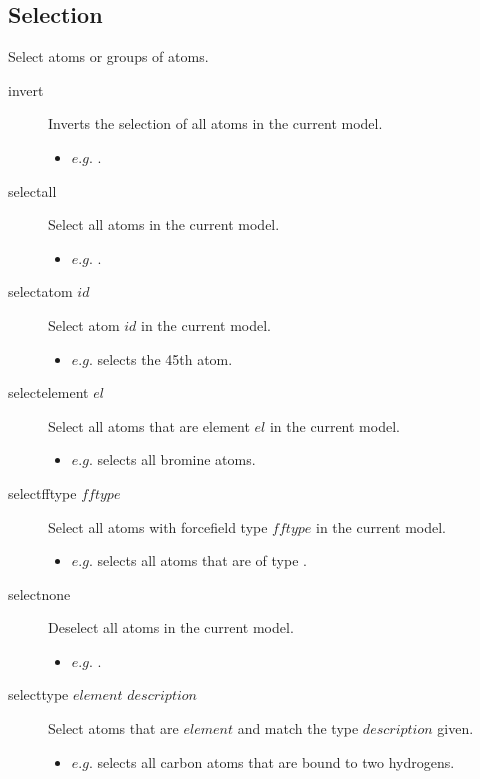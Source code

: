\subsection{Selection}
Select atoms or groups of atoms.\\
\begin{description}

	\item[invert\its] Inverts the selection of all atoms in the current model.
	\begin{itemize}
		\item $e.g.$ .
	\end{itemize}

	\item[selectall\its] Select all atoms in the current model.
	\begin{itemize}
		\item $e.g.$ .
	\end{itemize}

	\item[selectatom $id$\its] Select atom $id$ in the current model.
	\begin{itemize}
		\item $e.g.$  selects the 45th atom.
	\end{itemize}

	\item[selectelement $el$\its] Select all atoms that are element $el$ in the current model.
	\begin{itemize}
		\item $e.g.$  selects all bromine atoms.
	\end{itemize}

	\item[selectfftype $fftype$\its] Select all atoms with forcefield type $fftype$ in the current model.
	\begin{itemize}
		\item $e.g.$  selects all atoms that are of type .
	\end{itemize}

	\item[selectnone\its] Deselect all atoms in the current model.
	\begin{itemize}
		\item $e.g.$ .
	\end{itemize}

	\item[selecttype $element$ $description$\its] Select atoms that are $element$ and match the type $description$ given.
	\begin{itemize}
		\item $e.g.$  selects all carbon atoms that are bound to two hydrogens.
	\end{itemize}

\end{description}


